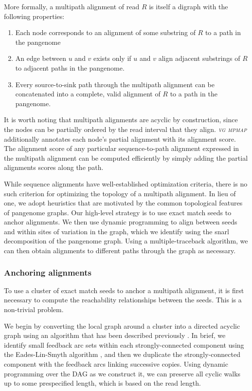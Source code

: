 \documentclass[11pt]{ucthesis}
\newcommand{\tool}[1]{\emph{\textsc{#1}}}
\begin{document}
More formally, a multipath alignment of read $R$ is itself a digraph with the following properties:

\begin{enumerate}
    \item Each node corresponds to an alignment of some substring of $R$ to a path in the pangenome
    \item An edge between $u$ and $v$ exists only if $u$ and $v$ align adjacent substrings of $R$ to adjacent paths in the pangenome.
    \item Every source-to-sink path through the multipath alignment can be concatenated into a complete, valid alignment of $R$ to a path in the pangenome.
\end{enumerate}

It is worth noting that multipath alignments are acyclic by construction, since the nodes can be partially ordered by the read interval that they align. \tool{vg mpmap} additionally annotates each node's partial alignment with its alignment score. The alignment score of any particular sequence-to-path alignment expressed in the multipath alignment can be computed efficiently by simply adding the partial alignments scores along the path.

While sequence alignments have well-established optimization criteria, there is no such criterion for optimizing the topology of a multipath alignment. In lieu of one, we adopt heuristics that are motivated by the common topological features of pangenome graphs. Our high-level strategy is to use exact match seeds to anchor alignments. We then use dynamic programming to align between seeds and within sites of variation in the graph, which we identify using the snarl decomposition of the pangenome graph. Using a multiple-traceback algorithm, we can then obtain alignments to different paths through the graph as necessary.

\subsubsection{Anchoring alignments}
\label{sec:anchoring}

To use a cluster of exact match seeds to anchor a multipath alignment, it is first necessary to compute the reachability relationships between the seeds. This is a non-trivial problem. 

We begin by converting the local graph around a cluster into a directed acyclic graph using an algorithm that has been described previously \cite{garrison2018variation}. In brief, we identify small feedback arc sets within each strongly-connected component using the Eades-Lin-Smyth algorithm \cite{eades1993fast}, and then we duplicate the strongly-connected component with the feedback arcs linking successive copies. Using dynamic programming over the DAG as we construct it, we can preserve all cyclic walks up to some prespecified length, which is based on the read length.
	
\end{document}
